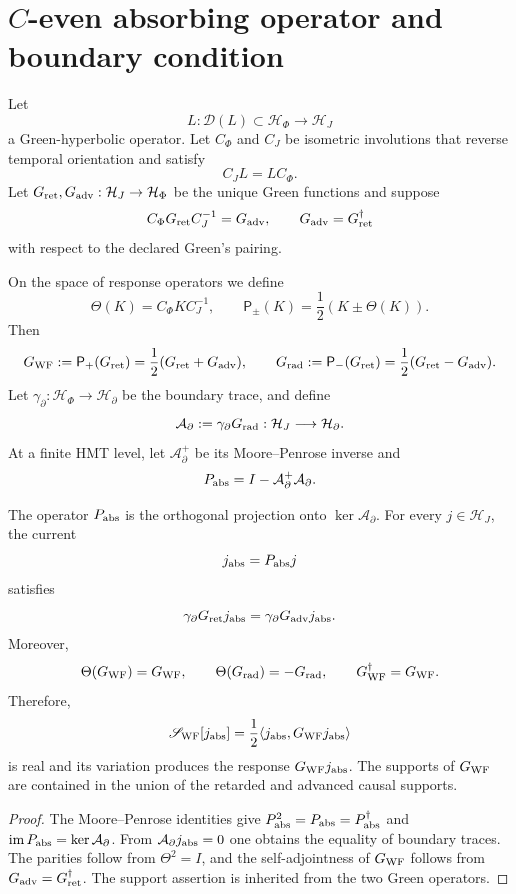 \section{\(C\)-even absorbing operator and boundary condition}
\label{sec:hmtf2-absorbedor}

Let
\[
 L:\mathcal D(L)\subset\mathcal H_\Phi\longrightarrow\mathcal H_J
\]
a Green-hyperbolic operator. Let \(C_\Phi\) and \(C_J\) be isometric
involutions that reverse temporal orientation and satisfy
\[
 C_J L=L C_\Phi.
\]
Let \(G_{\rm ret},G_{\rm adv}:\mathcal H_J\to\mathcal H_\Phi\) be the unique Green
functions and suppose
\[
 C_\Phi G_{\rm ret}C_J^{-1}=G_{\rm adv},
 \qquad
 G_{\rm adv}=G_{\rm ret}^{\dagger}
\]
with respect to the declared Green's pairing.

On the space of response operators we define
\[
 \Theta(K)=C_\Phi K C_J^{-1},\qquad
 \mathsf P_\pm(K)=\frac12(K\pm\Theta(K)).
\]
Then
\[
 G_{\rm WF}:=\mathsf P_+(G_{\rm ret})
 =\frac12(G_{\rm ret}+G_{\rm adv}),
 \qquad
 G_{\rm rad}:=\mathsf P_-(G_{\rm ret})
 =\frac12(G_{\rm ret}-G_{\rm adv}).
\]
Let \(\gamma_\partial:\mathcal H_\Phi\to\mathcal H_\partial\) be the boundary
trace, and define
\[
 \mathcal A_\partial
 :=\gamma_\partial G_{\rm rad}:
 \mathcal H_J\longrightarrow\mathcal H_\partial.
\]
At a finite HMT level, let \(\mathcal A_\partial^+\) be its Moore--Penrose
inverse and
\[
 P_{\rm abs}=I-\mathcal A_\partial^+\mathcal A_\partial.
\]

\begin{theorem}
\label{thm:hmtf2-absorbedor}
The operator \(P_{\rm abs}\) is the orthogonal projection onto
\(\ker\mathcal A_\partial\). For every \(j\in\mathcal H_J\), the current
\[
 j_{\rm abs}=P_{\rm abs}j
\]
satisfies
\[
 \gamma_\partial G_{\rm ret}j_{\rm abs}
 =\gamma_\partial G_{\rm adv}j_{\rm abs}.
\]
Moreover,
\[
 \Theta(G_{\rm WF})=G_{\rm WF},\qquad
 \Theta(G_{\rm rad})=-G_{\rm rad},\qquad
 G_{\rm WF}^{\dagger}=G_{\rm WF}.
\]
Therefore,
\[
 \mathscr S_{\rm WF}[j_{\rm abs}]
 =\frac12\langle j_{\rm abs},G_{\rm WF}j_{\rm abs}\rangle
\]
is real and its variation produces the response \(G_{\rm WF}j_{\rm abs}\).
The supports of \(G_{\rm WF}\) are contained in the union of the retarded and advanced
causal supports.
\end{theorem}

\begin{proof}
The Moore--Penrose identities give
\(P_{\rm abs}^2=P_{\rm abs}=P_{\rm abs}^{\dagger}\) and
\(\operatorname{im}P_{\rm abs}=\ker\mathcal A_\partial\). From
\(\mathcal A_\partial j_{\rm abs}=0\) one obtains the equality of boundary
traces. The parities follow from \(\Theta^2=I\), and the self-adjointness of
\(G_{\rm WF}\) follows from
\(G_{\rm adv}=G_{\rm ret}^{\dagger}\). The support assertion is inherited
from the two Green operators.
\end{proof}

